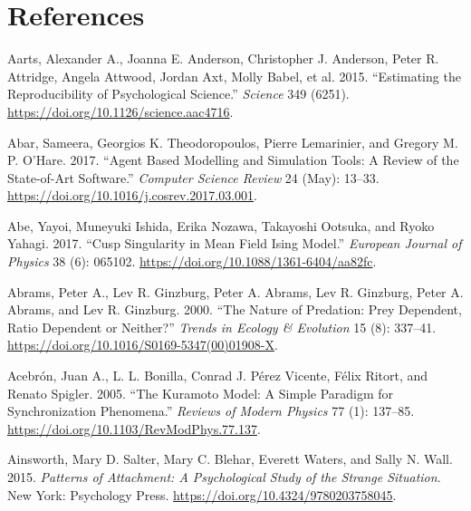 \documentclass[
  a4paper,
  DIV=11,
  numbers=noendperiod]{scrreprt}
\newlength{\cslhangindent}
\newlength{\cslentryspacingunit} %
\newenvironment{CSLReferences}[2] %
 {%
  \setlength{\parindent}{0pt}
  \ifodd #1
  \let\oldpar\par
  \def\par{\hangindent=\cslhangindent\oldpar}
  \fi
  \setlength{\parskip}{#2\cslentryspacingunit}
 }%
 {}
\begin{document}
\hypertarget{references}{%
\chapter*{References}\label{references}}


\hypertarget{refs}{}
\begin{CSLReferences}{1}{0}
\leavevmode{}%
Aarts, Alexander A., Joanna E. Anderson, Christopher J. Anderson, Peter
R. Attridge, Angela Attwood, Jordan Axt, Molly Babel, et al. 2015.
{``Estimating the Reproducibility of Psychological Science.''}
\emph{Science} 349 (6251).
\url{https://doi.org/10.1126/science.aac4716}.

\leavevmode{}%
Abar, Sameera, Georgios K. Theodoropoulos, Pierre Lemarinier, and
Gregory M. P. O'Hare. 2017. {``Agent {Based Modelling} and {Simulation}
Tools: {A} Review of the State-of-Art Software.''} \emph{Computer
Science Review} 24 (May): 13--33.
\url{https://doi.org/10.1016/j.cosrev.2017.03.001}.

\leavevmode{}%
Abe, Yayoi, Muneyuki Ishida, Erika Nozawa, Takayoshi Ootsuka, and Ryoko
Yahagi. 2017. {``Cusp Singularity in Mean Field {Ising} Model.''}
\emph{European Journal of Physics} 38 (6): 065102.
\url{https://doi.org/10.1088/1361-6404/aa82fc}.

\leavevmode{}%
Abrams, Peter A., Lev R. Ginzburg, Peter A. Abrams, Lev R. Ginzburg,
Peter A. Abrams, and Lev R. Ginzburg. 2000. {``The Nature of Predation:
Prey Dependent, Ratio Dependent or Neither?''} \emph{Trends in Ecology
\& Evolution} 15 (8): 337--41.
\url{https://doi.org/10.1016/S0169-5347(00)01908-X}.

\leavevmode{}%
Acebrón, Juan A., L. L. Bonilla, Conrad J. Pérez Vicente, Félix Ritort,
and Renato Spigler. 2005. {``The {Kuramoto} Model: {A} Simple Paradigm
for Synchronization Phenomena.''} \emph{Reviews of Modern Physics} 77
(1): 137--85. \url{https://doi.org/10.1103/RevModPhys.77.137}.

\leavevmode{}%
Ainsworth, Mary D. Salter, Mary C. Blehar, Everett Waters, and Sally N.
Wall. 2015. \emph{Patterns of {Attachment}: {A Psychological Study} of
the {Strange Situation}}. {New York}: {Psychology Press}.
\url{https://doi.org/10.4324/9780203758045}.


\end{CSLReferences}
\end{document}
